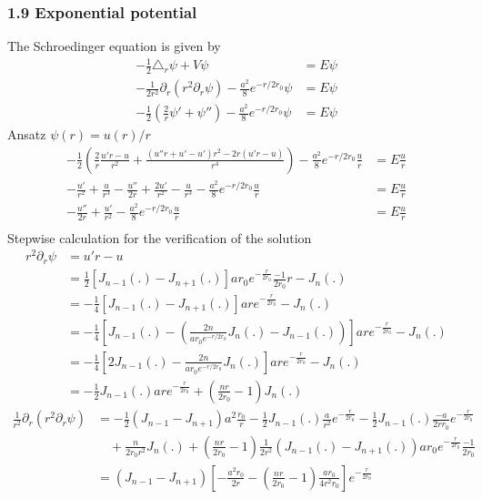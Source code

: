 \documentclass[10pt,a4paper]{book}
\theoremstyle{definition}
\begin{document}
\subsubsection{1.9 Exponential potential}
The Schroedinger equation is given by
\begin{align}
-\frac{1}{2}\triangle_r\psi+V\psi&=E\psi\\
-\frac{1}{2r^2}\partial_r(r^2\partial_r \psi)-\frac{a^2}{8}e^{-r/2r_0}\psi&=E\psi\\
-\frac{1}{2}\left(\frac{2}{r}\psi'+\psi''\right)-\frac{a^2}{8}e^{-r/2r_0}\psi&=E\psi
\end{align}
Ansatz $\psi(r)=u(r)/r$
\begin{align}
-\frac{1}{2}\left(\frac{2}{r}\frac{u'r-u}{r^2}+\frac{(u''r+u'-u')r^2-2r(u'r-u)}{r^4}\right)-\frac{a^2}{8}e^{-r/2r_0}\frac{u}{r}&=E\frac{u}{r}\\
-\frac{u'}{r^2}+\frac{u}{r^3}-\frac{u''}{2r}+\frac{2u'}{r^2}-\frac{u}{r^3}-\frac{a^2}{8}e^{-r/2r_0}\frac{u}{r}&=E\frac{u}{r}\\
-\frac{u''}{2r}+\frac{u'}{r^2}-\frac{a^2}{8}e^{-r/2r_0}\frac{u}{r}&=E\frac{u}{r}\\
\end{align}
Stepwise calculation for the verification of the solution
\begin{align}
r^2\partial_r \psi
&=u'r-u\\
&=\frac{1}{2}\left[J_{n-1}(.)-J_{n+1}(.)\right]ar_0e^{-\frac{r}{2r_0}}\frac{-1}{2r_0}r-J_n(.)\\
&=-\frac{1}{4}\left[J_{n-1}(.)-J_{n+1}(.)\right]are^{-\frac{r}{2r_0}}-J_n(.)\\
&=-\frac{1}{4}\left[J_{n-1}(.)-\left(\frac{2n}{ar_0e^{-r/2r_0}}J_n(.)-J_{n-1}(.)\right)\right]are^{-\frac{r}{2r_0}}-J_n(.)\\
&=-\frac{1}{4}\left[2J_{n-1}(.)-\frac{2n}{ar_0e^{-r/2r_0}}J_n(.)\right]are^{-\frac{r}{2r_0}}-J_n(.)\\
&=-\frac{1}{2}J_{n-1}(.)are^{-\frac{r}{2r_0}}+\left(\frac{nr}{2r_0}-1\right)J_n(.)
\end{align}
\begin{align}
\frac{1}{r^2}\partial_r(r^2\partial_r \psi)
&=-\frac{1}{2}\left(J_{n-1}-J_{n+1}\right)a^2\frac{r_0}{r}-\frac{1}{2}J_{n-1}(.)\frac{a}{r^2}e^{-\frac{r}{2r_0}}-\frac{1}{2}J_{n-1}(.)\frac{-a}{2rr_0}e^{-\frac{r}{2r_0}}\\
&\quad+\frac{n}{2r_0r^2}J_n(.)+\left(\frac{nr}{2r_0}-1\right)\frac{1}{2r^2}(J_{n-1}(.)-J_{n+1}(.))ar_0e^{-\frac{r}{2r_0}}\frac{-1}{2r_0}\\
&=\left(J_{n-1}-J_{n+1}\right)\left[-\frac{a^2r_0}{2r}-\left(\frac{nr}{2r_0}-1\right)\frac{ar_0}{4r^2r_0}\right]e^{-\frac{r}{2r_0}}
\end{align}
\end{document}
